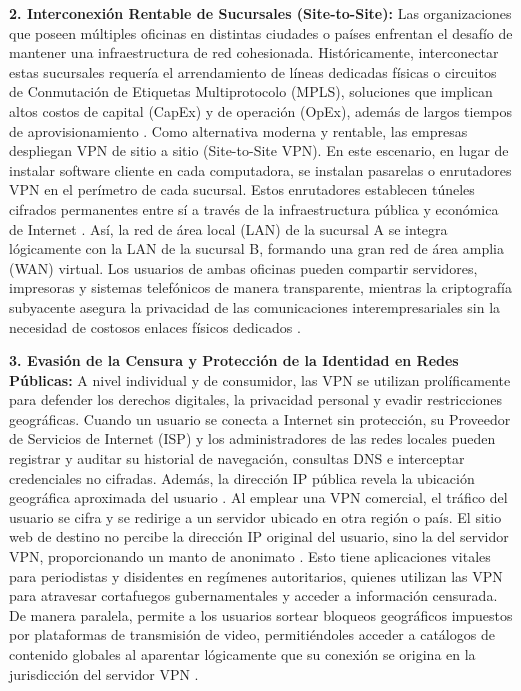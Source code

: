 \documentclass[a4paper,12pt]{article}
\begin{document}
\textbf{2. Interconexión Rentable de Sucursales (Site-to-Site):}
Las organizaciones que poseen múltiples oficinas en distintas ciudades o países enfrentan el desafío de mantener una infraestructura de red cohesionada. Históricamente, interconectar estas sucursales requería el arrendamiento de líneas dedicadas físicas o circuitos de Conmutación de Etiquetas Multiprotocolo (MPLS), soluciones que implican altos costos de capital (CapEx) y de operación (OpEx), además de largos tiempos de aprovisionamiento \cite{cisco_vpn_types}. Como alternativa moderna y rentable, las empresas despliegan VPN de sitio a sitio (Site-to-Site VPN). En este escenario, en lugar de instalar software cliente en cada computadora, se instalan pasarelas o enrutadores VPN en el perímetro de cada sucursal. Estos enrutadores establecen túneles cifrados permanentes entre sí a través de la infraestructura pública y económica de Internet \cite{fortinet_site}. Así, la red de área local (LAN) de la sucursal A se integra lógicamente con la LAN de la sucursal B, formando una gran red de área amplia (WAN) virtual. Los usuarios de ambas oficinas pueden compartir servidores, impresoras y sistemas telefónicos de manera transparente, mientras la criptografía subyacente asegura la privacidad de las comunicaciones interempresariales sin la necesidad de costosos enlaces físicos dedicados \cite{ibm_vpn}.

\textbf{3. Evasión de la Censura y Protección de la Identidad en Redes Públicas:}
A nivel individual y de consumidor, las VPN se utilizan prolíficamente para defender los derechos digitales, la privacidad personal y evadir restricciones geográficas. Cuando un usuario se conecta a Internet sin protección, su Proveedor de Servicios de Internet (ISP) y los administradores de las redes locales pueden registrar y auditar su historial de navegación, consultas DNS e interceptar credenciales no cifradas. Además, la dirección IP pública revela la ubicación geográfica aproximada del usuario \cite{kaspersky_vpn}. Al emplear una VPN comercial, el tráfico del usuario se cifra y se redirige a un servidor ubicado en otra región o país. El sitio web de destino no percibe la dirección IP original del usuario, sino la del servidor VPN, proporcionando un manto de anonimato \cite{aws_vpn}. Esto tiene aplicaciones vitales para periodistas y disidentes en regímenes autoritarios, quienes utilizan las VPN para atravesar cortafuegos gubernamentales y acceder a información censurada. De manera paralela, permite a los usuarios sortear bloqueos geográficos impuestos por plataformas de transmisión de video, permitiéndoles acceder a catálogos de contenido globales al aparentar lógicamente que su conexión se origina en la jurisdicción del servidor VPN \cite{nordvpn_uses}.
\end{document}
